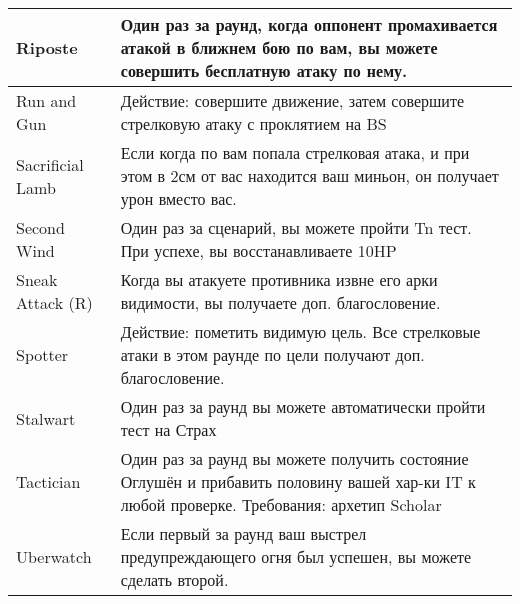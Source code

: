 \begin{table}[h]
\begin{tabularx}{\textwidth}{|l|X|}
        Riposte            & Один раз за раунд, когда оппонент промахивается атакой в ближнем бою по вам, вы можете совершить бесплатную атаку по нему.                                                                                                         \\ \hline
        Run and Gun        & Действие: совершите движение, затем совершите стрелковую атаку с проклятием на BS                                                                                                                                                  \\ \hline
        Sacrificial Lamb   & Если когда по вам попала стрелковая атака, и при этом в 2см от вас находится ваш миньон, он получает урон вместо вас.                                                                                                              \\ \hline
        Second Wind        & Один раз за сценарий, вы можете пройти Tn тест. При успехе, вы восстанавливаете 10HP                                                                                                                                               \\ \hline
        Sneak Attack (R)   & Когда вы атакуете противника извне его арки видимости, вы получаете доп. благословение.                                                                                                                                            \\ \hline
        Spotter            & Действие: пометить видимую цель. Все стрелковые атаки в этом раунде по цели получают доп. благословение.                                                                                                                           \\ \hline
        Stalwart           & Один раз за раунд вы можете автоматически пройти тест на Страх                                                                                                                                                                     \\ \hline
        Tactician          & Один раз за раунд вы можете получить состояние Оглушён и прибавить половину вашей хар-ки IT к любой проверке. Требования: архетип Scholar                                                                                          \\ \hline
        Uberwatch          & Если первый за раунд ваш выстрел предупреждающего огня был успешен, вы можете сделать второй.                                                                                                                                      \\ \hline

\end{tabularx}
\end{table}
